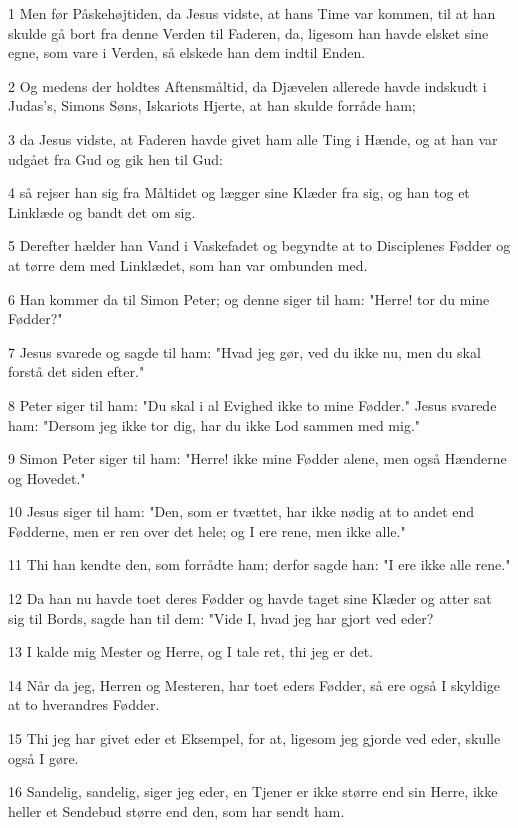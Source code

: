 \par 1 Men før Påskehøjtiden, da Jesus vidste, at hans Time var kommen, til at han skulde gå bort fra denne Verden til Faderen, da, ligesom han havde elsket sine egne, som vare i Verden, så elskede han dem indtil Enden.
\par 2 Og medens der holdtes Aftensmåltid, da Djævelen allerede havde indskudt i Judas's, Simons Søns, Iskariots Hjerte, at han skulde forråde ham;
\par 3 da Jesus vidste, at Faderen havde givet ham alle Ting i Hænde, og at han var udgået fra Gud og gik hen til Gud:
\par 4 så rejser han sig fra Måltidet og lægger sine Klæder fra sig, og han tog et Linklæde og bandt det om sig.
\par 5 Derefter hælder han Vand i Vaskefadet og begyndte at to Disciplenes Fødder og at tørre dem med Linklædet, som han var ombunden med.
\par 6 Han kommer da til Simon Peter; og denne siger til ham: "Herre! tor du mine Fødder?"
\par 7 Jesus svarede og sagde til ham: "Hvad jeg gør, ved du ikke nu, men du skal forstå det siden efter."
\par 8 Peter siger til ham: "Du skal i al Evighed ikke to mine Fødder." Jesus svarede ham: "Dersom jeg ikke tor dig, har du ikke Lod sammen med mig."
\par 9 Simon Peter siger til ham: "Herre! ikke mine Fødder alene, men også Hænderne og Hovedet."
\par 10 Jesus siger til ham: "Den, som er tvættet, har ikke nødig at to andet end Fødderne, men er ren over det hele; og I ere rene, men ikke alle."
\par 11 Thi han kendte den, som forrådte ham; derfor sagde han: "I ere ikke alle rene."
\par 12 Da han nu havde toet deres Fødder og havde taget sine Klæder og atter sat sig til Bords, sagde han til dem: "Vide I, hvad jeg har gjort ved eder?
\par 13 I kalde mig Mester og Herre, og I tale ret, thi jeg er det.
\par 14 Når da jeg, Herren og Mesteren, har toet eders Fødder, så ere også I skyldige at to hverandres Fødder.
\par 15 Thi jeg har givet eder et Eksempel, for at, ligesom jeg gjorde ved eder, skulle også I gøre.
\par 16 Sandelig, sandelig, siger jeg eder, en Tjener er ikke større end sin Herre, ikke heller et Sendebud større end den, som har sendt ham.
